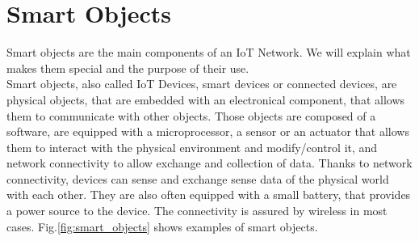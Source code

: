 

\section{Smart Objects}

Smart objects are the main components of an IoT Network. We will explain what makes them special and the purpose of their use.\\

Smart objects, also called IoT Devices, smart devices or connected devices, are physical objects, that are embedded with an electronical component, that allows them to communicate with other objects. Those objects are composed of a software, are equipped with a microprocessor, a sensor or an actuator that allows them to interact with the physical environment and modify/control it, and network connectivity to allow exchange and collection of data. Thanks to network connectivity, devices can sense and exchange sense data of the physical world with each other. They are also often equipped with a small battery, that provides a power source to the device. The connectivity is assured by wireless in most cases. Fig.\ref{fig:smart_objects} shows examples of smart objects.\\

